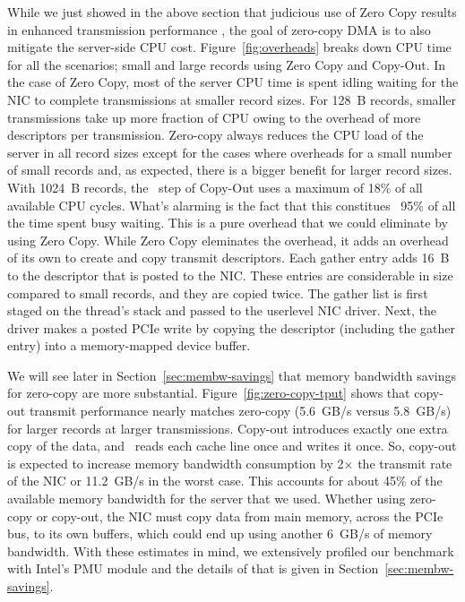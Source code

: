
While we just showed in the above section that judicious use of Zero Copy results in enhanced transmission performance
, the goal of zero-copy DMA is to also mitigate the server-side CPU cost. Figure~\ref{fig:overheads} breaks down
CPU time for all the scenarios; small and large records using Zero Copy and Copy-Out. In the case 
of Zero Copy, most of the server CPU time is spent idling waiting for the NIC 
to complete transmissions at smaller record sizes. For 128~B records,
smaller transmissions take up more fraction of CPU owing to the overhead of more descriptors
per transmission. Zero-copy always reduces the CPU load of the server in all record sizes except for the cases where
overheads for a small number of small records and, as expected, there is a bigger
benefit for larger record sizes. 
With 1024~B records, the \memcpy ~step of Copy-Out uses a maximum of 18\% of all available
CPU cycles. What's alarming is the fact that this constitues ~95\% of all the time spent busy waiting.
This is a pure overhead that we could eliminate by using Zero Copy. While Zero Copy eleminates the \memcpy overhead, it adds an overhead of its own to create and copy transmit descriptors.
Each gather entry adds 16~B to the descriptor that is posted to the NIC.
These entries are considerable in size compared to
small records, and they are copied twice. The gather list
is first staged on the thread's stack and passed to the userlevel NIC driver. Next,
the driver makes a posted PCIe write by copying the descriptor (including the
gather entry) into a memory-mapped device buffer.





We will see later in Section~\ref{sec:membw-savings} that memory bandwidth savings for zero-copy are more substantial.
Figure~\ref{fig:zero-copy-tput} shows that copy-out transmit performance nearly
matches zero-copy (5.6~GB/s versus 5.8~GB/s) for larger records at larger transmissions. Copy-out introduces exactly one
extra copy of the data, and \memcpy~reads each cache line once and writes it
once. So, copy-out is expected to increase memory bandwidth consumption
by 2$\times$ the transmit rate of the NIC or 11.2~GB/s in the worst case.  This
accounts for about 45\% of the available memory bandwidth for the server that we used. Whether
using zero-copy or copy-out, the NIC must copy data from main memory, across the PCIe bus, to its own buffers, which
could end up using another 6~GB/s of memory bandwidth. With these estimates in mind, we extensively profiled
 our benchmark with Intel's PMU module and the details of that is given in Section~\ref{sec:membw-savings}.


